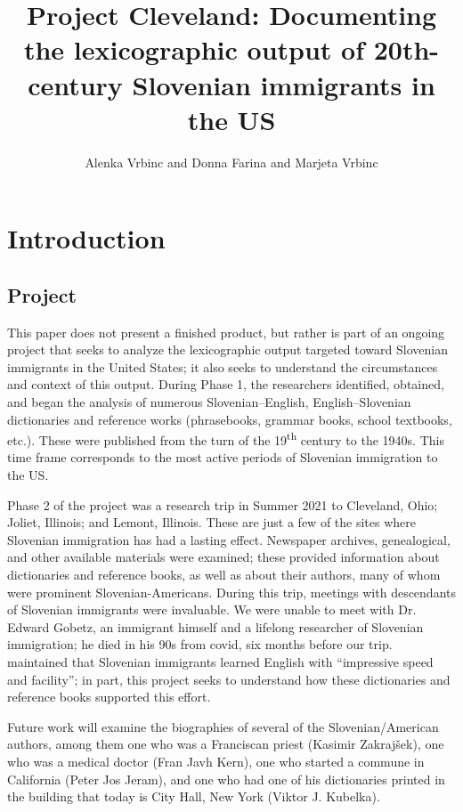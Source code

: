 \documentclass[output=paper,colorlinks,citecolor=brown,arabicfont,chinesefont]{langscibook}
\author{Alenka Vrbinc\affiliation{University of Ljubljana} and
        Donna Farina\affiliation{New Jersey City University} and
        Marjeta Vrbinc\affiliation{University of Ljubljana}}
\title[Project Cleveland]
      {Project Cleveland: Documenting the lexicographic output of 20th-century Slovenian immigrants in the US}
\begin{document}
\maketitle

\section{Introduction}

\subsection{Project}

This paper does not present a finished product, but rather is part of an ongoing project that seeks to analyze the lexicographic output targeted toward Slovenian immigrants in the United States; it also seeks to understand the circumstances and context of this output. During Phase 1, the researchers identified, obtained, and began the analysis of numerous Slovenian–English, English–Slovenian dictionaries and reference works (phrasebooks, grammar books, school textbooks, etc.). These were published from the turn of the 19\textsuperscript{th} century to the 1940s. This time frame corresponds to the most active periods of Slovenian immigration to the US.

Phase 2 of the project was a research trip in Summer 2021 to Cleveland, Ohio; Joliet, Illinois; and Lemont, Illinois. These are just a few of the sites where Slovenian immigration has had a lasting effect. Newspaper archives, genealogical, and other available materials were examined; these provided information about dictionaries and reference books, as well as about their authors, many of whom were prominent Slovenian-Americans. During this trip, meetings with descendants of Slovenian immigrants were invaluable. We were unable to meet with Dr. Edward Gobetz, an immigrant himself and a lifelong researcher of Slovenian immigration; he died in his 90s from covid, six months before our trip. \citet{Gobetz2014} maintained that Slovenian immigrants learned English with “impressive speed and facility”; in part, this project seeks to understand how these dictionaries and reference books supported this effort.

Future work will examine the biographies of several of the Slovenian/American authors, among them one who was a Franciscan priest (Kasimir Zakrajšek), one who was a medical doctor (Fran Javh Kern), one who started a commune in California (Peter Jos Jeram), and one who had one of his dictionaries printed in the building that today is City Hall, New York (Viktor J. Kubelka).
\end{document}
